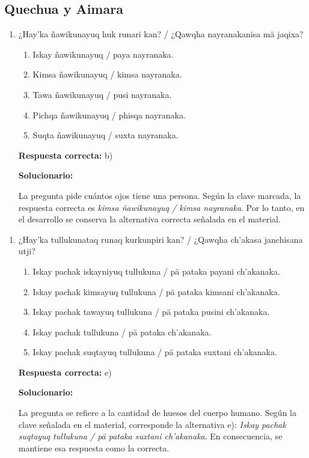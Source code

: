 \subsection*{Quechua y Aimara}

\begin{enumerate}
	
	\item ¿Hay'ka ñawikunayuq huk runari kan? / ¿Qawqha nayranakanisa mä jaqixa?
	
	\begin{enumerate}[label=\alph*)]
		\item Iskay ñawikunayuq / paya nayranaka.
		\item Kimsa ñawikunayuq / kimsa nayranaka.
		\item Tawa ñawikunayuq / pusi nayranaka.
		\item Pichqa ñawikunayuq / phisqa nayranaka.
		\item Suqta ñawikunayuq / suxta nayranaka.
	\end{enumerate}
	
	\textbf{Respuesta correcta:} b)
	
	\vspace{2mm}
	\textbf{Solucionario:}
	
	La pregunta pide cuántos ojos tiene una persona. Según la clave marcada, la respuesta correcta es \textit{kimsa ñawikunayuq / kimsa nayranaka}. Por lo tanto, en el desarrollo se conserva la alternativa correcta señalada en el material.
	
\end{enumerate}

\begin{enumerate}[resume]
	
	\item ¿Hay'ka tullukunataq runaq kurkunpiri kan? / ¿Qawqha ch'akasa janchisana utji?
	
	\begin{enumerate}[label=\alph*)]
		\item Iskay pachak iskayniyuq tullukuna / pä pataka payani ch'akanaka.
		\item Iskay pachak kimsayuq tullukuna / pä pataka kimsani ch'akanaka.
		\item Iskay pachak tawayuq tullukuna / pä pataka pusini ch'akanaka.
		\item Iskay pachak tullukuna / pä pataka ch'akanaka.
		\item Iskay pachak suqtayuq tullukuna / pä pataka suxtani ch'akanaka.
	\end{enumerate}
	
	\textbf{Respuesta correcta:} e)
	
	\vspace{2mm}
	\textbf{Solucionario:}
	
	La pregunta se refiere a la cantidad de huesos del cuerpo humano. Según la clave señalada en el material, corresponde la alternativa e): \textit{Iskay pachak suqtayuq tullukuna / pä pataka suxtani ch'akanaka}. En consecuencia, se mantiene esa respuesta como la correcta.
	
\end{enumerate}
	




